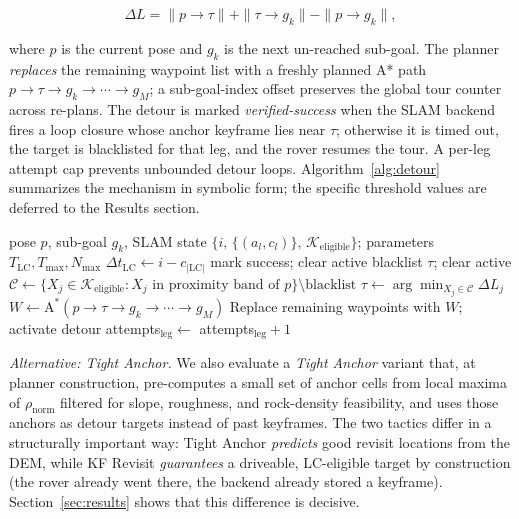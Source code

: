 \documentclass[letterpaper,times]{IONconf}
\begin{document}
\begin{equation}
\Delta L = \|p \!\to\! \tau\| + \|\tau \!\to\! g_k\| - \|p \!\to\! g_k\|,
\end{equation}

where $p$ is the current pose and $g_k$ is the next un-reached sub-goal. The planner \emph{replaces} the remaining waypoint list with a freshly planned A* path $p \to \tau \to g_k \to \cdots \to g_M$; a sub-goal-index offset preserves the global tour counter across re-plans. The detour is marked \emph{verified-success} when the SLAM backend fires a loop closure whose anchor keyframe lies near $\tau$; otherwise it is timed out, the target is blacklisted for that leg, and the rover resumes the tour. A per-leg attempt cap prevents unbounded detour loops. Algorithm~\ref{alg:detour} summarizes the mechanism in symbolic form; the specific threshold values are deferred to the Results section.

\begin{algorithm}[t]
\small
\caption{Online Keyframe-Revisit Detour}
\label{alg:detour}
\begin{algorithmic}[1]
\Require pose $p$, sub-goal $g_k$, SLAM state $\{i,\,\{(a_l, c_l)\},\,\mathcal{K}_{\text{eligible}}\}$; parameters $T_{\text{LC}}, T_{\max}, N_{\max}$
\State $\Delta t_{\text{LC}} \gets i - c_{|\text{LC}|}$
     mark success; clear active
     blacklist $\tau$; clear active
    \EndIf
    \State \Return
\EndIf
{} \State \Return \EndIf
\State $\mathcal{C} \gets \{X_j \in \mathcal{K}_{\text{eligible}} : X_j \text{ in proximity band of } p\} \setminus \text{blacklist}$
 \State \Return \EndIf
\State $\tau \gets \arg\min_{X_j \in \mathcal{C}} \Delta L_j$
\State $W \gets \mathrm{A^*}(p \!\to\! \tau \!\to\! g_k \!\to\! \cdots \!\to\! g_M)$
\State Replace remaining waypoints with $W$; activate detour
\State attempts$_{\text{leg}} \gets$ attempts$_{\text{leg}} + 1$
\end{algorithmic}
\end{algorithm}

\emph{Alternative: Tight Anchor.} We also evaluate a \emph{Tight Anchor} variant that, at planner construction, pre-computes a small set of anchor cells from local maxima of $\rho_{\text{norm}}$ filtered for slope, roughness, and rock-density feasibility, and uses those anchors as detour targets instead of past keyframes. The two tactics differ in a structurally important way: Tight Anchor \emph{predicts} good revisit locations from the DEM, while KF Revisit \emph{guarantees} a driveable, LC-eligible target by construction (the rover already went there, the backend already stored a keyframe). Section~\ref{sec:results} shows that this difference is decisive.
\end{document}
